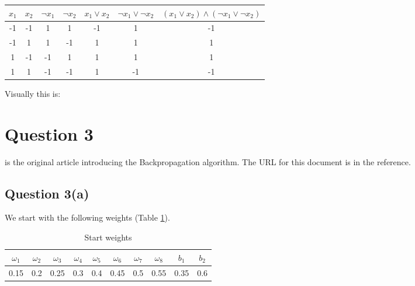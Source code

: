 \documentclass[10pt,a4paper]{article}
\begin{document}
\begin{tabular}{|c|c|c|c|c|c|c|}
\hline
$x_1$ & $x_2$ & $\neg x_1$ & $\neg x_2$ & $x_1 \vee x_2$ & $\neg x_1 \vee \neg x_2$ & $(x_1 \vee x_2)\wedge (\neg x_1 \vee \neg x_2)$\\
\hline
-1 &-1 &1 &1 & -1& 1 & -1\\
-1 &1 &1 &-1 & 1& 1 & 1\\
1 &-1 &-1 &1 & 1& 1 & 1\\
1 &1 &-1 &-1 & 1& -1 & -1\\
\hline
\end{tabular}

Visually this is:

\begin{center}
\end{center}



\section{Question 3}

\cite{rumel} is the original article introducing the Backpropagation algorithm. The URL for this document is in the reference.

\subsection{Question 3(a)}

We start with the following weights (Table \ref{table1}).

\begin{table}
\begin{tabular}{|c|c|c|c|c|c|c|c|c|c|}
\hline
$\omega_1$ & $\omega_2$ & $\omega_3$ & $\omega_4$ & $\omega_5$ & $\omega_6$ & $\omega_7$ & $\omega_8$ & $b_1$ & $b_2$\\
\hline
0.15 &0.2 &0.25 & 0.3 & 0.4 & 0.45 & 0.5 & 0.55 & 0.35 & 0.6 \\
\hline
\end{tabular}
\caption{Start weights}\label{table1}
\end{table}
\end{document}
